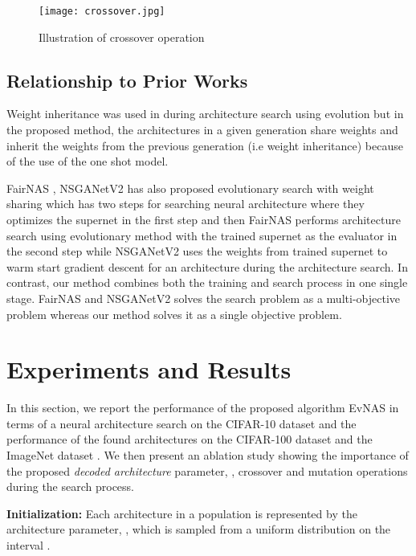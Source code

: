 \documentclass[final]{cvpr}
\begin{document}
\begin{figure}[h]
\begin{center}
\texttt{[image: crossover.jpg]}
  \end{center}
  \caption{Illustration of crossover operation}
  \label{fig:crossover}
  \end{figure}

\subsection{Relationship to Prior Works}
Weight inheritance was used in \cite{real2017large} during architecture search
using evolution but in the proposed method, the architectures in a given generation
share weights and inherit the weights from the previous generation (i.e weight
inheritance) because of the use of the one shot model.

FairNAS \cite{chu2019fairnas}, NSGANetV2 \cite{lu2020nsganetv2} has also proposed evolutionary search
with weight sharing which has two steps for searching neural architecture where they optimizes the
supernet in the first step and then FairNAS performs architecture search using evolutionary method with
the trained supernet as the evaluator in the second step while NSGANetV2 uses the weights from trained
supernet to warm start gradient descent for an architecture during the architecture search. In
contrast, our method combines both the training and search process in one single stage.
FairNAS and NSGANetV2 solves the search problem as a multi-objective problem whereas our method solves
it as a single objective problem.

\section{Experiments and Results}
\label{experiments}
In this section, we report the performance of the proposed algorithm EvNAS in terms of a neural 
architecture search on the CIFAR-10 dataset \cite{krizhevsky2009learning} and the performance of
the found architectures on the CIFAR-100 dataset \cite{krizhevsky2009learning} and the
ImageNet dataset \cite{imagenet_cvpr09}. We then present an ablation study showing the importance
of the proposed \textit{decoded architecture} parameter, , crossover and
mutation operations during the search process.

\textbf{Initialization:} Each architecture in a population is represented by the architecture
parameter, , which is sampled from a uniform distribution on the interval
.
\end{document}

